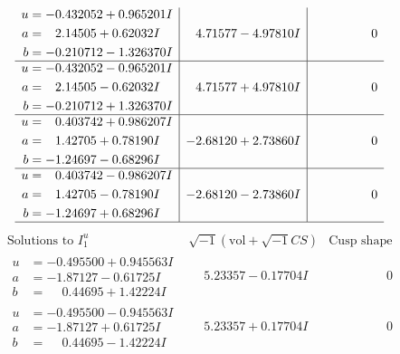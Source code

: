 \documentclass[1p]{elsarticle_modified}
\theoremstyle{definition}
\newcommand{\I}{\sqrt{-1}}
\begin{document}
$$\begin{array}{c|c|c}
\begin{aligned}
u &= -0.432052 + 0.965201 I \\
a &= \phantom{-}2.14505 + 0.62032 I \\
b &= -0.210712 - 1.326370 I\end{aligned}
 & \phantom{-}4.71577 - 4.97810 I & \phantom{-0.000000 } 0 \\ \hline\begin{aligned}
u &= -0.432052 - 0.965201 I \\
a &= \phantom{-}2.14505 - 0.62032 I \\
b &= -0.210712 + 1.326370 I\end{aligned}
 & \phantom{-}4.71577 + 4.97810 I & \phantom{-0.000000 } 0 \\ \hline\begin{aligned}
u &= \phantom{-}0.403742 + 0.986207 I \\
a &= \phantom{-}1.42705 + 0.78190 I \\
b &= -1.24697 - 0.68296 I\end{aligned}
 & -2.68120 + 2.73860 I & \phantom{-0.000000 } 0 \\ \hline\begin{aligned}
u &= \phantom{-}0.403742 - 0.986207 I \\
a &= \phantom{-}1.42705 - 0.78190 I \\
b &= -1.24697 + 0.68296 I\end{aligned}
 & -2.68120 - 2.73860 I & \phantom{-0.000000 } 0\\
 \hline 
 \end{array}$$\newpage$$\begin{array}{c|c|c}  
\text{Solutions to }I^u_{1}& \I (\text{vol} + \sqrt{-1}CS) & \text{Cusp shape}\\
 \hline 
\begin{aligned}
u &= -0.495500 + 0.945563 I \\
a &= -1.87127 - 0.61725 I \\
b &= \phantom{-}0.44695 + 1.42224 I\end{aligned}
 & \phantom{-}5.23357 - 0.17704 I & \phantom{-0.000000 } 0 \\ \hline\begin{aligned}
u &= -0.495500 - 0.945563 I \\
a &= -1.87127 + 0.61725 I \\
b &= \phantom{-}0.44695 - 1.42224 I\end{aligned}
 & \phantom{-}5.23357 + 0.17704 I & \phantom{-0.000000 } 0 \\ \hline\begin{aligned}

\end{aligned}
\end{array}$$
\end{document}
